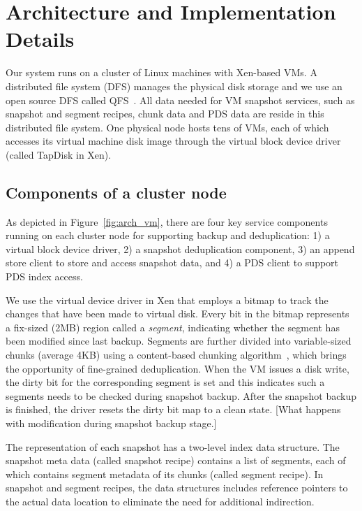 \section{Architecture and Implementation Details}
\label{sect:architecture}
Our system runs on a cluster of Linux machines with Xen-based VMs.
A distributed file system (DFS) manages the physical disk storage and we use 
an open source DFS called QFS~\cite{QFS}. 
All data needed for VM snapshot services, such as snapshot and segment recipes,
chunk data and PDS data are reside in this distributed file system. 
One physical node hosts tens of VMs, each of which accesses its virtual machine disk image through the
virtual block device driver (called TapDisk\cite{Warfield2005} in Xen).

\subsection{ Components of a cluster node } 
As depicted in Figure~\ref{fig:arch_vm}, 
there are four key service components running on each cluster
node  for supporting backup and deduplication: 
1) a virtual block device driver, 2) a snapshot deduplication component,
3) an append store client to store  and access snapshot data,
and 4)  a PDS client to support PDS index access. 

We use the virtual device driver in Xen that employs a bitmap to track the changes 
that have been made to virtual disk.
Every bit in the bitmap represents a fix-sized (2MB) region called a \textit{segment}, indicating whether the segment
has been modified since last backup. 
Segments are further divided into variable-sized chunks (average 4KB) 
using a content-based chunking algorithm~\cite{frame05}, 
which brings the opportunity of fine-grained deduplication.
When the VM issues a disk write, the dirty bit for the corresponding segment is set
and this indicates such a segments needs to be checked during snapshot backup. 
After the snapshot backup is finished, the driver resets the dirty bit map to a clean state.
[What happens with modification during snapshot backup stage.]

The representation of each snapshot has  a two-level index data structure.
The snapshot meta data (called snapshot recipe) contains a list of segments, each of which contains segment
metadata of its chunks (called segment recipe).
In snapshot and segment recipes, 
the data structures  includes reference pointers to the actual data location to eliminate the need for additional indirection.

